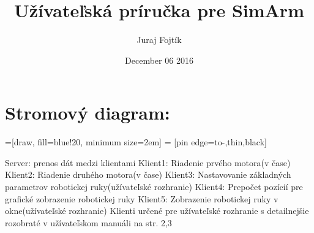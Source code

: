 \documentclass{article}
\title{Užívateľská príručka pre SimArm}
\date{December 06 2016}
\author{Juraj Fojtí­k}
\begin{document}
\maketitle
\section{Stromový diagram:}
=[draw, fill=blue!20, minimum size=2em]
 = [pin edge={to-,thin,black}]
\newline\newline
Server: prenos dát medzi klientami\newline
Klient1: Riadenie prvého motora(v čase)\newline
Klient2: Riadenie druhého motora(v čase)\newline
Klient3: Nastavovanie základných parametrov robotickej ruky(užívateľské rozhranie)\newline
Klient4: Prepočet pozícií pre grafické zobrazenie robotickej ruky\newline
Klient5: Zobrazenie robotickej ruky v okne(užívateľské rozhranie) \newline\newline
Klienti určené pre užívateľské rozhranie s detailnejšie rozobraté v užívateľskom manuáli na str. 2,3
\end{document}
